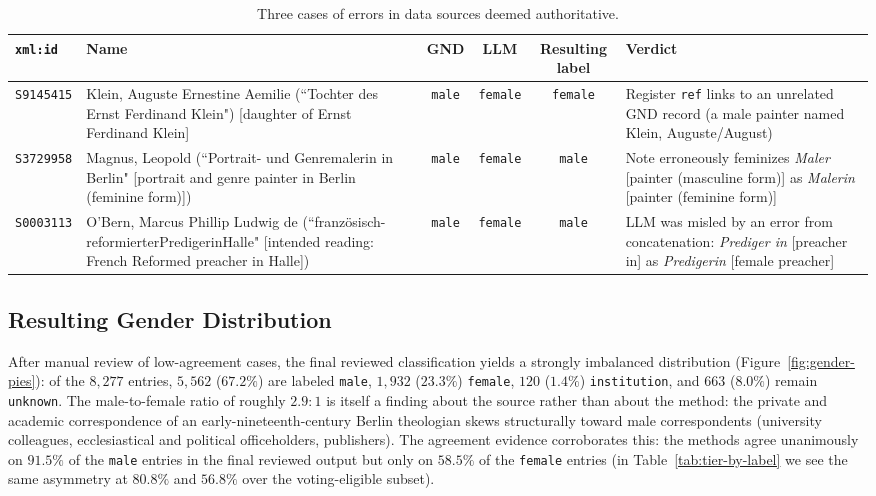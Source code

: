 \documentclass{eceasst}
\begin{document}
\begin{table}[h]
  \centering
  \scriptsize
  \begin{tabular}{@{}lp{36mm}cccp{38mm}@{}}
    \toprule
    \texttt{xml:id} & Name & GND & LLM & Resulting label & Verdict \\
    \midrule
    \texttt{S9145415} &
    Klein, Auguste Ernestine Aemilie (``Tochter des Ernst Ferdinand Klein") [daughter of Ernst Ferdinand Klein] &
    \texttt{male} & \texttt{female} & \texttt{female} &
    Register \texttt{ref} links to an unrelated GND record (a male painter named Klein, Auguste/August)\\
    \addlinespace
    \texttt{S3729958} &
    Magnus, Leopold (``Portrait- und Genremalerin in Berlin" [portrait and genre painter in Berlin (feminine form)]) &
    \texttt{male} & \texttt{female} & \texttt{male} &
    Note erroneously feminizes \emph{Maler} [painter (masculine form)] as \emph{Malerin} [painter (feminine form)] \\
    \addlinespace
    \texttt{S0003113} &
    O'Bern, Marcus Phillip Ludwig de (``französisch-reformierterPredigerinHalle" [intended reading: French Reformed preacher in Halle]) &
    \texttt{male} & \texttt{female} & \texttt{male} &
    LLM was misled by an error from concatenation: \emph{Prediger in} [preacher in] as \emph{Predigerin} [female preacher] \\
    \bottomrule
  \end{tabular}
  \caption{Three cases of errors in data sources deemed authoritative.}
  \label{tab:contested-examples}
\end{table}

\subsection{Resulting Gender Distribution} After manual review of low-agreement cases, the final reviewed classification yields a strongly imbalanced distribution (Figure~\ref{fig:gender-pies}): of the $8{,}277$ entries, $5{,}562$ ($67.2\%$) are labeled \texttt{male}, $1{,}932$ ($23.3\%$) \texttt{female}, $120$ ($1.4\%$) \texttt{institution}, and $663$ ($8.0\%$) remain \texttt{unknown}. The male-to-female ratio of roughly $2.9{:}1$ is itself a finding about the source rather than about the method: the private and academic correspondence of an early-nineteenth-century Berlin theologian skews structurally toward male correspondents (university colleagues, ecclesiastical and political officeholders, publishers). The agreement evidence corroborates this: the methods agree unanimously on $91.5\%$ of the \texttt{male} entries in the final reviewed output but only on $58.5\%$ of the \texttt{female} entries (in Table~\ref{tab:tier-by-label} we see the same asymmetry at $80.8\%$ and $56.8\%$ over the voting-eligible subset).
\end{document}
